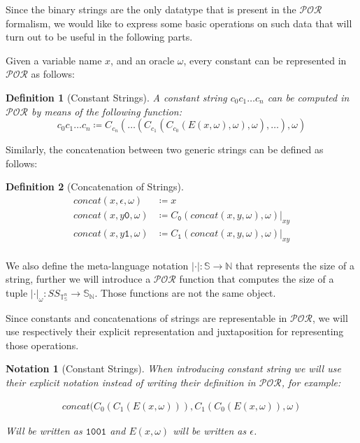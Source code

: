 \documentclass[10pt]{amsart}
\newcommand{\POR}{\mathcal{POR}}
\newcommand{\zero}{\mathtt{0}}
\newcommand{\one}{\mathtt{1}}
\newcommand{\vone}{x}
\newcommand{\vtwo}{y}
\newcommand{\NN}{\mathbb{N}}
\renewcommand{\SS}{\mathbb{S}}
\newcommand{\Tuples}{\mathbb{T
}}
\newcommand{\mci}[1]{c_{#1}}
\newcommand{\oone}{\omega}
\newcommand{\concat}{concat}
\newtheorem{defn}{Definition}
\newtheorem{notation}{Notation}
\begin{document}
Since the binary strings are the only datatype that is present in the $\POR$ formalism, we would like to express some basic operations on such data that will turn out to be useful in the following parts.

Given a variable name $\vone$, and an oracle $\oone$, every constant can be represented in $\POR$ as follows:

\begin{defn}[Constant Strings]
A constant string $\mci 0\mci1\ldots\mci n$ can be computed in $\POR$ by means of the following function:
\[
\mci 0\mci1\ldots\mci n \coloneqq C_{\mci n}(\ldots(C_{\mci1}(C_{\mci0}(E(\vone, \oone), \oone), \oone), \ldots), \oone)
\]
\end{defn}

Similarly, the concatenation between two generic strings can be defined as follows:

\begin{defn}[Concatenation of Strings]
\begin{align*}
\concat(\vone, \epsilon, \oone) &\coloneqq \vone\\
\concat(\vone, \vtwo \zero, \oone) &\coloneqq C_\zero (\concat(\vone,\vtwo, \oone), \oone)|_{\vone\vtwo}\\
\concat(\vone, \vtwo \one, \oone) &\coloneqq C_\one (\concat(\vone,\vtwo, \oone), \oone)|_{\vone\vtwo}\\
\end{align*}
\end{defn}

We also define the meta-language notation $|\cdot|: \SS \longrightarrow \NN $ that represents the size of a string, further we will introduce a $\POR$ function that computes the size of a tuple $|\cdot|_\oone: SS_{\Tuples_\SS^n}\longrightarrow \SS_\NN$. Those functions are not the same object.

Since constants and concatenations of strings are representable in $\POR$, we will use respectively their explicit representation and juxtaposition for representing those operations.

\begin{notation}[Constant Strings]
When introducing constant string we will use their explicit notation instead of writing their definition in $\POR$, for example:

\begin{align*}
\concat(C_0(C_1(E(x, \oone))), C_1(C_0(E(x, \oone)), \oone)
\end{align*}

Will be written as $\one \zero\zero\one$ and $E(x, \oone)$ will be written as $\epsilon$.
\end{notation}
\end{document}
